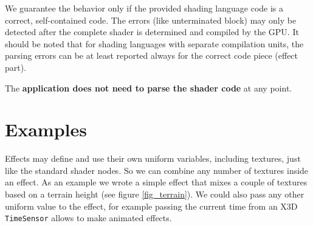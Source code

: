 \documentclass{egpubl}
\begin{document}
We guarantee the behavior only if the provided shading language code
is a correct, self-contained code. The errors (like unterminated block)
may only be detected after the complete shader
is determined and compiled by the GPU.
It should be noted that for shading languages with separate compilation units,
the parsing errors can be at least reported always for the correct code piece
(effect part).

The \textbf{application does not need to parse the shader code} at any point.




\section{Examples}

Effects may define and use their own uniform variables, including textures,
just like the standard shader nodes. So we can combine any number of textures
inside an effect. As an example we wrote a simple effect that mixes a couple of
textures based on a terrain height (see figure \ref{fig_terrain}).
We could also pass any other uniform value to the effect, for example
passing the current time from an X3D \texttt{TimeSensor} allows to make
animated effects.
\end{document}
